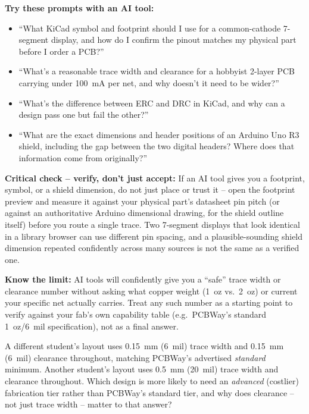 \documentclass[11pt]{article}
\begin{document}
\begin{aicollab}
\textbf{Try these prompts with an AI tool:}
\begin{itemize}[leftmargin=*,nosep]
  \item ``What KiCad symbol and footprint should I use for a common-cathode
        7-segment display, and how do I confirm the pinout matches my physical
        part before I order a PCB?''
  \item ``What's a reasonable trace width and clearance for a hobbyist 2-layer PCB
        carrying under 100~mA per net, and why doesn't it need to be wider?''
  \item ``What's the difference between ERC and DRC in KiCad, and why can a design
        pass one but fail the other?''
  \item ``What are the exact dimensions and header positions of an Arduino Uno R3
        shield, including the gap between the two digital headers? Where does that
        information come from originally?''
\end{itemize}

\medskip\textbf{Critical check -- verify, don't just accept:}
If an AI tool gives you a footprint, symbol, or a shield dimension, do not just
place or trust it -- open the footprint preview and measure it against your
physical part's datasheet pin pitch (or against an authoritative Arduino
dimensional drawing, for the shield outline itself) before you route a single
trace. Two 7-segment displays that look identical in a library browser can use
different pin spacing, and a plausible-sounding shield dimension repeated
confidently across many sources is not the same as a verified one.

\medskip\textbf{Know the limit:}
AI tools will confidently give you a ``safe'' trace width or clearance number
without asking what copper weight (1~oz vs.\ 2~oz) or current your specific net
actually carries. Treat any such number as a starting point to verify against your
fab's own capability table (e.g.\ PCBWay's standard 1~oz/6~mil specification), not
as a final answer.
\end{aicollab}

\takehomebanner

\begin{trace}
A different student's layout uses 0.15~mm (6~mil) trace width and 0.15~mm (6~mil)
clearance throughout, matching PCBWay's advertised \emph{standard} minimum. Another
student's layout uses 0.5~mm (20~mil) trace width and clearance throughout. Which
design is more likely to need an \emph{advanced} (costlier) fabrication tier rather
than PCBWay's standard tier, and why does clearance -- not just trace width -- matter
to that answer?
\end{trace}
\end{document}
